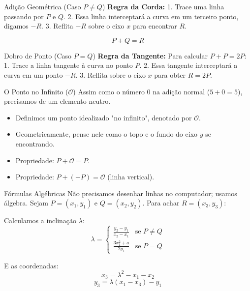 \documentclass[aspectratio=169]{beamer}
\begin{document}
\begin{frame}{Adição Geométrica (Caso $P \neq Q$)}
  \textbf{Regra da Corda:}
  1. Trace uma linha passando por $P$ e $Q$.
  2. Essa linha interceptará a curva em um terceiro ponto, digamos $-R$.
  3. Reflita $-R$ sobre o eixo $x$ para encontrar $R$.
  
  $$ P + Q = R $$
\end{frame}

\begin{frame}{Dobro de Ponto (Caso $P = Q$)}
  \textbf{Regra da Tangente:}
  Para calcular $P + P = 2P$:
  1. Trace a linha tangente à curva no ponto $P$.
  2. Essa tangente interceptará a curva em um ponto $-R$.
  3. Reflita sobre o eixo $x$ para obter $R = 2P$.
\end{frame}

\begin{frame}{O Ponto no Infinito ($\mathcal{O}$)}
  Assim como o número 0 na adição normal ($5 + 0 = 5$), precisamos de um elemento neutro.
  
  \begin{itemize}
      \item Definimos um ponto idealizado "no infinito", denotado por $\mathcal{O}$.
      \item Geometricamente, pense nele como o topo e o fundo do eixo $y$ se encontrando.
      \item Propriedade: $P + \mathcal{O} = P$.
      \item Propriedade: $P + (-P) = \mathcal{O}$ (linha vertical).
  \end{itemize}
\end{frame}

\begin{frame}{Fórmulas Algébricas}
  Não precisamos desenhar linhas no computador; usamos álgebra.
  Sejam $P=(x_1, y_1)$ e $Q=(x_2, y_2)$. Para achar $R=(x_3, y_3)$:
  
  Calculamos a inclinação $\lambda$:
  $$ \lambda = \begin{cases} \frac{y_2 - y_1}{x_2 - x_1} & \text{se } P \neq Q \\ \frac{3x_1^2 + a}{2y_1} & \text{se } P = Q \end{cases} $$
  
  E as coordenadas:
  $$ x_3 = \lambda^2 - x_1 - x_2 $$
  $$ y_3 = \lambda(x_1 - x_3) - y_1 $$
\end{frame}
\end{document}
